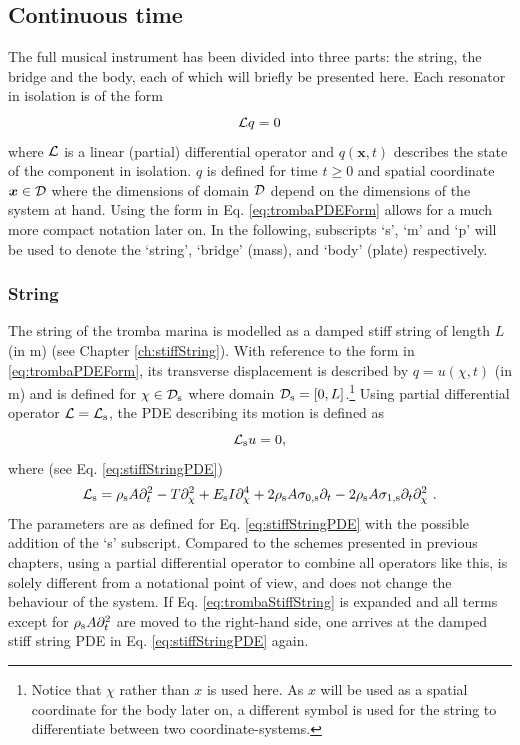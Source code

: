 \subsection{Continuous time}
The full musical instrument has been divided into three parts: the string, the bridge and the body, each of which will briefly be presented here. Each resonator in isolation is of the form 
\begin{equation}\label{eq:trombaPDEForm}
    \mathcal{L} q = 0
\end{equation}
where $\mathcal{L}$ is a linear (partial) differential operator and $q(\boldsymbol{x}, t)$ describes the state of the component in isolation. $q$ is defined for time $t\geq 0$ and spatial coordinate $\boldsymbol{x}\in \mathcal{D}$ where the dimensions of domain $\mathcal{D}$ depend on the dimensions of the system at hand. Using the form in Eq. \eqref{eq:trombaPDEForm} allows for a much more compact notation later on. In the following, subscripts `s', `m' and `p' will be used to denote the `string', `bridge' (mass), and `body' (plate) respectively.

\subsubsection{String}
The string of the tromba marina is modelled as a damped stiff string of length $L$ (in m) (see Chapter \ref{ch:stiffString}). With reference to the form in \eqref{eq:trombaPDEForm}, its transverse displacement is described by $q = u(\chi, t)$ (in m) and is defined for $\chi \in \mathcal{D}_{\text{s}}$ where domain $\mathcal{D}_{\text{s}} = [0, L]$.\footnote{Notice that $\chi$ rather than $x$ is used here. As $x$ will be used as a spatial coordinate for the body later on, a different symbol is used for the string to differentiate between two coordinate-systems.} Using partial differential operator $\mathcal{L} = \mathcal{L}_\text{s}$, the PDE describing its motion is defined as
\begin{equation}\label{eq:trombaStiffString}
    \mathcal{L}_{\text{s}} u =  0,
\end{equation}
where (see Eq. \eqref{eq:stiffStringPDE})
\begin{equation*}
    \L_\stxt = \rho_\stxt A \ptt - T\partial_\chi^2 + E_\text{s}I\partial_\chi^4+2\rho_\stxt A\szX[\stxt]\pt-2\rho_\stxt A\soX[\stxt]\pt\partial_\chi^2\ .
\end{equation*}
The parameters are as defined for Eq. \eqref{eq:stiffStringPDE} with the possible addition of the `s' subscript.
Compared to the schemes presented in previous chapters, using a partial differential operator to combine all operators like this, is solely different from a notational point of view, and does not change the behaviour of the system. If Eq. \eqref{eq:trombaStiffString} is expanded and all terms except for $\rho_{\text{s}} A \partial_t^2$ are moved to the right-hand side, one arrives at the damped stiff string PDE in Eq. \eqref{eq:stiffStringPDE} again.

